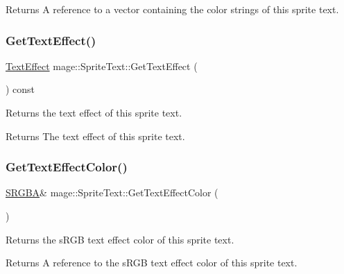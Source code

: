 \begin{DoxyReturn}{Returns}
A reference to a vector containing the color strings of this sprite text. 
\end{DoxyReturn}
\hypertarget{classmage_1_1_sprite_text_a1f5b83df9a7332ac3774a038df169847}{}\label{classmage_1_1_sprite_text_a1f5b83df9a7332ac3774a038df169847} 
\subsubsection{\texorpdfstring{Get\+Text\+Effect()}{GetTextEffect()}}
{\footnotesize\ttfamily \hyperlink{classmage_1_1_sprite_text_a4d3101d037b6fe4247d77b5fbf811dd2}{Text\+Effect} mage\+::\+Sprite\+Text\+::\+Get\+Text\+Effect (\begin{DoxyParamCaption}{ }\end{DoxyParamCaption}) const\hspace{0.3cm}{\ttfamily [noexcept]}}

Returns the text effect of this sprite text.

\begin{DoxyReturn}{Returns}
The text effect of this sprite text. 
\end{DoxyReturn}
\hypertarget{classmage_1_1_sprite_text_a0b8d0df75efa9dd9e666b68db6ee71b5}{}\label{classmage_1_1_sprite_text_a0b8d0df75efa9dd9e666b68db6ee71b5} 
\subsubsection{\texorpdfstring{Get\+Text\+Effect\+Color()}{GetTextEffectColor()}\hspace{0.1cm}{\footnotesize\ttfamily [1/2]}}
{\footnotesize\ttfamily \hyperlink{structmage_1_1_s_r_g_b_a}{S\+R\+G\+BA}\& mage\+::\+Sprite\+Text\+::\+Get\+Text\+Effect\+Color (\begin{DoxyParamCaption}{ }\end{DoxyParamCaption})\hspace{0.3cm}{\ttfamily [noexcept]}}

Returns the s\+R\+GB text effect color of this sprite text.

\begin{DoxyReturn}{Returns}
A reference to the s\+R\+GB text effect color of this sprite text. 
\end{DoxyReturn}
\hypertarget{classmage_1_1_sprite_text_af9f15b5b215e1433cee2152a5ce5e299}{}\label{classmage_1_1_sprite_text_af9f15b5b215e1433cee2152a5ce5e299} 
